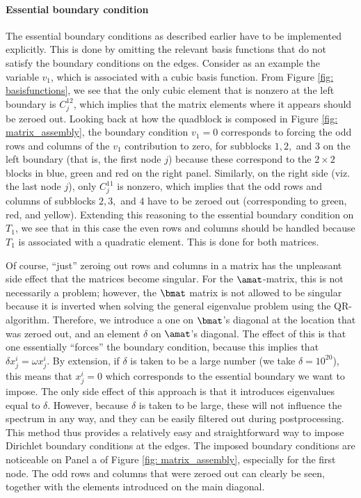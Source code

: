 \paragraph{Essential boundary condition}
The essential boundary conditions as described earlier have to be implemented explicitly. This is done by omitting the relevant basis functions that do not satisfy the boundary conditions on the edges. Consider as an example the variable $v_1$, which is associated with a cubic basis function. From Figure \ref{fig: basisfunctions}, we see that the only cubic element that is nonzero at the left boundary is $C_j^{12}$, which implies that the matrix elements where it appears should be zeroed out. Looking back at how the quadblock is composed in Figure \ref{fig: matrix_assembly}, the boundary condition $v_1 = 0$ corresponds to forcing the odd rows and columns of the $v_1$ contribution to zero, for subblocks $1, 2,$ and $3$ on the left boundary (that is, the first node $j$) because these correspond to the $2 \times 2$ blocks in blue, green and red on the right panel. Similarly, on the right side (viz. the last node $j$), only $C_j^{11}$ is nonzero, which implies that the odd rows and columns of subblocks $2, 3,$ and $4$ have to be zeroed out (corresponding to green, red, and yellow). Extending this reasoning to the essential boundary condition on $T_1$, we see that in this case the even rows and columns should be handled because $T_1$ is associated with a quadratic element. This is done for both matrices.

Of course, ``just'' zeroing out rows and columns in a matrix has the unpleasant side effect that the matrices become singular. For the $\amat$-matrix, this is not necessarily a problem; however, the $\bmat$ matrix is not allowed to be singular because it is inverted when solving the general eigenvalue problem using the QR-algorithm. Therefore, we introduce a one on $\bmat$'s diagonal at the location that was zeroed out, and an element $\delta$ on $\amat$'s diagonal. The effect of this is that one essentially ``forces'' the boundary condition, because this implies that $\delta x_j^i = \omega x_j^i$. By extension, if $\delta$ is taken to be a large number (we take $\delta = 10^{20}$), this means that $x_j^i = 0$ which corresponds to the essential boundary we want to impose. The only side effect of this approach is that it introduces eigenvalues equal to $\delta$. However, because $\delta$ is taken to be large, these will not influence the spectrum in any way, and they can be easily filtered out during postprocessing. This method thus provides a relatively easy and straightforward way to impose Dirichlet boundary conditions at the edges. The imposed boundary conditions are noticeable on Panel a of Figure \ref{fig: matrix_assembly}, especially for the first node. The odd rows and columns that were zeroed out can clearly be seen, together with the elements introduced on the main diagonal.

